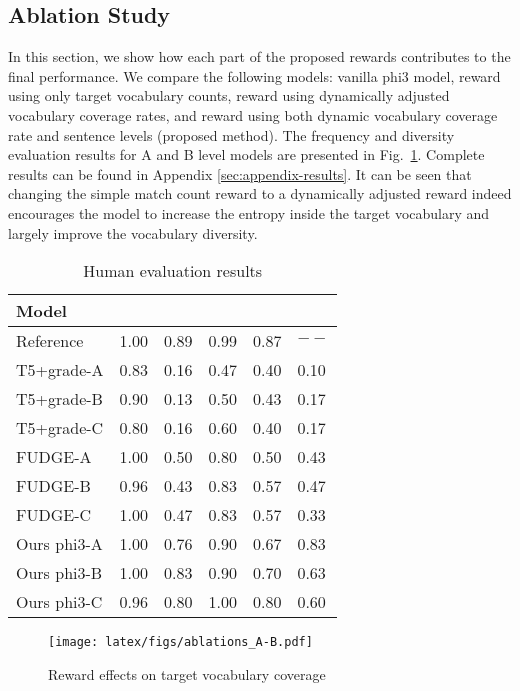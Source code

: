 \subsection{Ablation Study}
In this section, we show how each part of the proposed rewards contributes to the final performance. We compare the following models: vanilla phi3 model, reward using only target vocabulary counts, reward using dynamically adjusted vocabulary coverage rates, and reward using both dynamic vocabulary coverage rate and sentence levels (proposed method). 
The frequency and diversity evaluation results for A and B level models are presented in Fig.~\ref{fig:ablation}. Complete results can be found in Appendix \ref{sec:appendix-results}.
It can be seen that changing the simple match count reward to a dynamically adjusted reward indeed encourages the model to increase the entropy inside the target vocabulary and largely improve the vocabulary diversity. 

\begin{table}[t!]
    \small
    \centering
   \begin{adjustbox}{width=1\linewidth}
    \begin{tabular}{l L L L L L} \hline
    Model &   &   &   &  &  \\ \hline
     Reference & 1.00 & 0.89 & 0.99 & 0.87 & $--$ \\
     T5+grade-A & 0.83 & 0.16 & 0.47 &0.40 &0.10 \\
     T5+grade-B & 0.90 & 0.13 & 0.50 &0.43  &0.17\\
     T5+grade-C & 0.80 &0.16& 0.60
     &0.40 &0.17 \\
     FUDGE-A & 1.00 & 0.50 & 0.80 & 0.50 &0.43\\
     FUDGE-B & 0.96 & 0.43 & 0.83 &0.57&0.47\\
     FUDGE-C & 1.00 & 0.47 & 0.83&0.57&0.33\\
     \hline
     Ours phi3-A & 1.00 &  0.76 & 0.90 & 0.67 &0.83 \\ 
     Ours phi3-B & 1.00 & 0.83 & 0.90 &0.70 &0.63 \\
     Ours phi3-C & 0.96 & 0.80 & 1.00 &0.80 &0.60 \\ \hline
    \end{tabular}
   \end{adjustbox}
    \caption{Human evaluation results}
    
    \label{tab:human}
\end{table}

\begin{figure}[t!]
    \centering
    \texttt{[image: latex/figs/ablations\_A-B.pdf]}
    \caption{
    Reward effects on target vocabulary coverage
    }
    \label{fig:ablation}
\end{figure}




